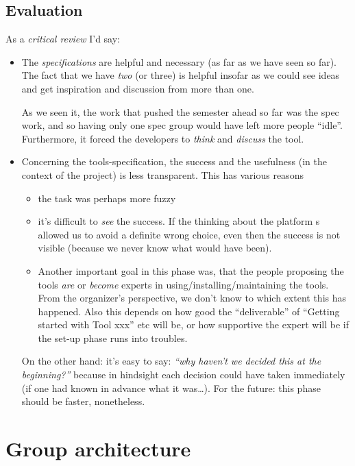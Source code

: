 \documentclass[11pt,handout]{handout}
\begin{document}
\subsection*{Evaluation}

As a \emph{critical review} I'd say:


\begin{itemize}
\item The \emph{specifications} are helpful and necessary (as far as we
  have seen so far). The fact that we have \emph{two} (or three) is helpful
  insofar as we could see ideas and get inspiration and discussion from
  more than one. 
  
  As we seen it, the work that pushed the semester ahead so far was the
  spec work, and so having only one spec group would have left more people
  ``idle''.  Furthermore, it forced the developers to \emph{think} and
  \emph{discuss} the tool.
\item Concerning the tools-specification, the success and the usefulness
  (in the context of the project) is less transparent. This has various
  reasons
  \begin{itemize}
  \item the task was perhaps more fuzzy
  \item it's difficult to \emph{see} the success. If the thinking about the
    platform s allowed us to avoid a definite wrong choice, even then the
    success is not visible (because we never know what would have been).
  \item Another important goal in this phase was, that the people proposing
    the tools \emph{are} or \emph{become} experts in
    using/installing/maintaining the tools. From the organizer's
    perspective, we don't know to which extent this has happened. Also this
    depends on how good the ``deliverable'' of ``Getting started with Tool
    xxx'' etc will be, or how supportive the expert will be if the set-up
    phase runs into troubles.
  \end{itemize}
  On the other hand: it's easy to say: \emph{``why haven't we decided this
    at the beginning?''} because in hindsight each decision could have
  taken immediately (if one had known in advance what it was\ldots). For the
  future: this phase should be faster, nonetheless.
\end{itemize}




\section*{Group architecture}
\end{document}
